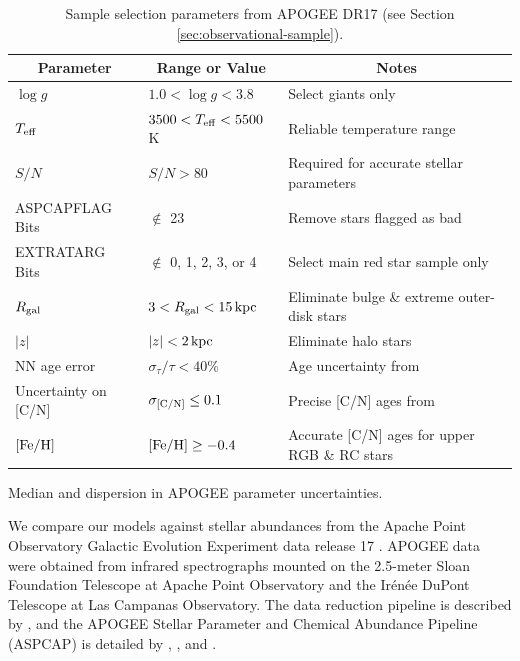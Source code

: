 \documentclass[twocolumn,twocolappendix,linenumbers]{aastex631}
\newcommand{\mathFeH}{{\rm [Fe/H]}}
\newcommand{\kpc}{\,{\rm kpc}}
\begin{document}
\begin{table}
    \centering
    \caption{Sample selection parameters from APOGEE DR17 (see Section \ref{sec:observational-sample}).}
    \label{tab:sample}
    \begin{tabular}{lll}
        \hline\hline
        \multicolumn{1}{c}{Parameter} & \multicolumn{1}{c}{Range or Value} & \multicolumn{1}{c}{Notes} \\
        \hline
        $\log g$            & $1.0 < \log g < 3.8$          & Select giants only \\
        $T_{\rm eff}$       & $3500 < T_{\rm eff} < 5500$ K & Reliable temperature range \\
        $S/N$               & $S/N > 80$                    & Required for accurate stellar parameters \\
        ASPCAPFLAG Bits     & $\notin$ 23                   & Remove stars flagged as bad \\
        EXTRATARG Bits      & $\notin$ 0, 1, 2, 3, or 4     & Select main red star sample only \\
        $R_{\rm gal}$     & $3 < R_{\rm gal} < 15\kpc$    & Eliminate bulge \& extreme outer-disk stars \\
        $|z|$               & $|z| < 2\kpc$                 & Eliminate halo stars \\
        \hline
        NN age error        & $\sigma_\tau/\tau < 40\%$     & Age uncertainty from \citet{leung_variational_2023} \\
        Uncertainty on [C/N]    & $\sigma_{\rm [C/N]}\leq0.1$     & Precise [C/N] ages from \citet{roberts_cn_2025} \\
        ${\rm [Fe/H]}$      & $\mathFeH\geq-0.4$            & Accurate [C/N] ages for upper RGB \& RC stars \\
        \hline
    \end{tabular}
\end{table}

\begin{table}
    \centering
    \caption{Median and dispersion in APOGEE parameter uncertainties.}
    \label{tab:uncertainties}
    
\end{table}

We compare our models against stellar abundances from the Apache Point Observatory Galactic Evolution Experiment \citep[APOGEE;][]{majewski_apache_2017} data release 17 \citep[DR17;][]{abdurrouf_seventeenth_2022}. APOGEE data were obtained from infrared spectrographs \citep{wilson_apache_2019} mounted on the 2.5-meter Sloan Foundation Telescope \citep{gunn_25_2006} at Apache Point Observatory and the Ir{\'e}n{\'e}e DuPont Telescope \citep{bowen_optical_1973} at Las Campanas Observatory. The data reduction pipeline is described by \citet{nidever_data_2015}, and the APOGEE Stellar Parameter and Chemical Abundance Pipeline (ASPCAP) is detailed by \citet{holtzman_abundances_2015}, \citet{garcia_perez_aspcap_2016}, and \citet{jonsson_apogee_2020}.
\end{document}
